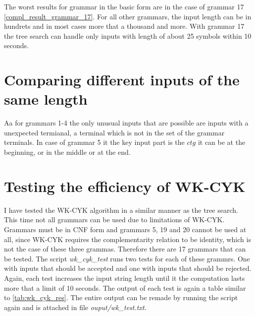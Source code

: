 The worst results for grammar in the basic form are in the case of grammar 17 \ref{compl_result_grammar_17}. For all other grammars, the input length can be in hundrets and in most cases more that a thousand and more. With grammar 17 the tree search can handle only inputs with length of about 25 symbols within 10 seconds.

\section{Comparing different inputs of the same length}
Aa for grammars 1-4 the only unusual inputs that are possible are inputs with a unexpected termianal, a terminal which is not in the set of the grammar terminals.
In case of grammar 5 it the key input part is the $ctg$ it can be at the beginning, or in the middle or at the end.

\section{Testing the efficiency of WK-CYK}

I have tested the WK-CYK algorithm in a similar manner as the tree search. This time not all grammars can be used due to limitations of WK-CYK. Grammars must be in CNF form and grammars 5, 19 and 20 cannot be used at all, since WK-CYK requires the complementarity relation to be identity, which is not the case of these three grammas. Therefore there are 17 grammars that can be tested. The script \textit{wk\_cyk\_test} runs two tests for each of these grammrs. One with inputs that should be accepted and one with inputs that should be rejected. Again, each test increases the input string length until it the computation lasts more that a limit of 10 seconds. The output of each test is again a table similar to \ref{tab:wk_cyk_res}. The entire output can be remade by running the script again and is attached in file \textit{ouput/wk\_test.txt}.

